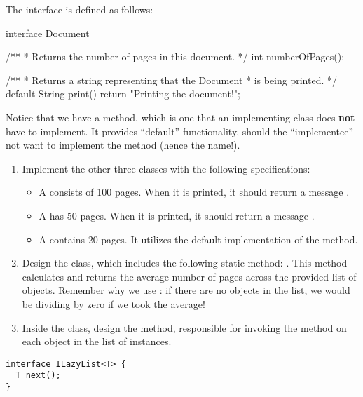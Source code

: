 \noindent The  interface is defined as follows:
\begin{verbnobox}[\small]
interface Document {

  /**
   * Returns the number of pages in this document.
   */
  int numberOfPages();

  /**
   * Returns a string representing that the Document
   * is being printed.
   */
  default String print() {
    return "Printing the document!";
  }
}
\end{verbnobox}

Notice that we have a  method, which is one that an implementing class does \textbf{not} have to implement. It provides ``default'' functionality, should the ``implementee'' not want to implement the method (hence the name!).

\begin{enumerate}[label=(\alph*)]
\item Implement the other three classes with the following specifications:
\begin{itemize}
\item A  consists of 100 pages. When it is printed, it should return a message .
\item A  has 50 pages. When it is printed, it should return a message .
\item A  contains 20 pages. It utilizes the default implementation of the  method.
\end{itemize}
\item Design the  class, which includes the following static method: . This method calculates and returns the average number of pages across the provided list of  objects. Remember why we use : if there are no  objects in the list, we would be dividing by zero if we took the average! 
\item Inside the  class, design the  method, responsible for invoking the  method on each object in the list of  instances.
\end{enumerate}

\begin{lstlisting}[language=MyJava]
interface ILazyList<T> {
  T next();
}
\end{lstlisting}

